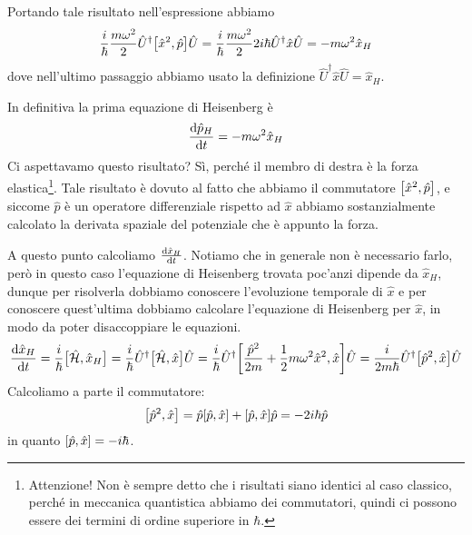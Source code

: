 \begin{soluzione}
   Portando tale risultato nell'espressione abbiamo
   \begin{equation*}
      \frac{i}{\hbar} \frac{m \omega^2}{2} \hat{U}^{\dag}\qty[ \hat{x}^2, \hat{p} ]\hat{U}
      =\frac{i}{\hbar} \frac{m\omega^2}{2} 2 i\hbar \hat{U}^{\dag} \hat{x} \hat{U}
      =-m\omega^2\hat{x}_H
   \end{equation*}
   dove nell'ultimo passaggio abbiamo usato la definizione $\hat{U}^{\dag} \hat{x} \hat{U}=\hat{x}_H$.

   In definitiva la prima equazione di Heisenberg è
   \begin{equation*}
      \dv{\hat{p}_H}{t}
      =-m\omega^2\hat{x}_H
   \end{equation*}
   Ci aspettavamo questo risultato? Sì, perché il membro di destra è la forza elastica\footnote{Attenzione! Non è sempre detto che i risultati siano identici al caso classico, perché in meccanica quantistica abbiamo dei commutatori, quindi ci possono essere dei termini di ordine superiore in $\hbar$.}. Tale risultato è dovuto al fatto che abbiamo il commutatore $\qty[ \hat{x}^2, \hat{p} ]$, e siccome $\hat{p}$ è un operatore differenziale rispetto ad $\hat{x}$ abbiamo sostanzialmente calcolato la derivata spaziale del potenziale che è appunto la forza.

   A questo punto calcoliamo $\dv{\hat{x}_H}{t}$. Notiamo che in generale non è necessario farlo, però in questo caso l'equazione di Heisenberg trovata poc'anzi dipende da $\hat{x}_H$, dunque per risolverla dobbiamo conoscere l'evoluzione temporale di $\hat{x}$ e per conoscere quest'ultima dobbiamo calcolare l'equazione di Heisenberg per $\hat{x}$, in modo da poter disaccoppiare le equazioni.
   \begin{gather*}
      \dv{\hat{x}_H}{t}
      =\frac{i}{\hbar} \big[ \hat{\mathcal{H}}, \hat{x}_H \big]
      =\frac{i}{\hbar} \hat{U}^{\dag} \big[ \hat{\mathcal{H}}, \hat{x} \big] \hat{U}
      =\frac{i}{\hbar} \hat{U}^{\dag} \qty[ \frac{\hat{p}^2}{2m} + \frac{1}{2} m \omega^2 \hat{x}^2, \hat{x} ] \hat{U}
      =\frac{i}{2m\hbar} \hat{U}^{\dag}\qty[ \hat{p}^2, \hat{x} ]\hat{U}
   \end{gather*}
   Calcoliamo a parte il commutatore:
   \begin{equation*}
      \qty[ \hat{p}^2, \hat{x} ]
      =\hat{p}\qty[ \hat{p}, \hat{x} ] + \qty[ \hat{p}, \hat{x} ]\hat{p}
      =-2 i\hbar \hat{p}
   \end{equation*}
   in quanto $\qty[ \hat{p}, \hat{x}]=-i\hbar$.


\end{soluzione}
